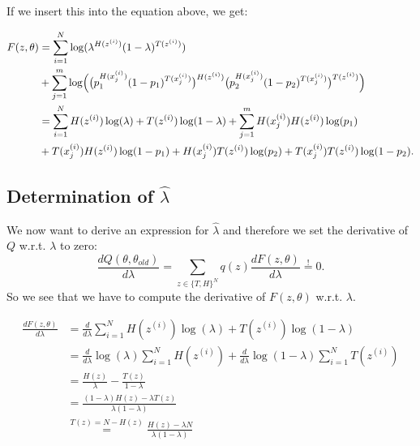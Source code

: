 \documentclass[paper=a4,fontsize=10pt,DIV11,BCOR10mm]{scrartcl}
\begin{document}
If we insert this into the equation above, we get:

\begin{align*}
F(z,\theta)&=\sum_{i=1}^N \log (\lambda^{H(z^{(i)})}(1-\lambda)^{T(z^{(i)})})\\
& + \sum_{j=1}^m \log \Bigl(\bigl( p_1^{H(x_j^{(i)})} (1-p_1)^{T(x_j^{(i)})}\bigr)^{H(z^{(i)})} \bigl(  p_2^{H(x_j^{(i)})} (1-p_2)^{T(x_j^{(i)})} \bigr)^{T(z^{(i)})} \Bigr)\\
&=\sum_{i=1}^N H(z^{(i)})\log (\lambda)+ T(z^{(i)}) \log (1-\lambda) +\sum_{j=1}^m  H(x_j^{(i)}) H(z^{(i)}) \log(p_1)\\
& + T(x_j^{(i)}) H(z^{(i)})\log(1-p_1) + H(x_j^{(i)})T(z^{(i)}) \log(p_2)+ T(x_j^{(i)})T(z^{(i)}) \log (1-p_2).
\end{align*}

\subsection*{Determination of $\hat \lambda$}
We now want to derive an expression for $\hat \lambda$ and therefore we set the derivative of $Q$ w.r.t. $\lambda$ to zero:
\begin{equation}\label{derQlambda}
\frac{dQ(\theta,\theta_{old})}{d\lambda}=\sum_{z\in \{T,H\}^N} q(z) \frac{dF(z,\theta)}{d\lambda} \stackrel{!}{=}0.
\end{equation}
So we see that we have to compute the derivative of $F(z,\theta)$ w.r.t. $\lambda$.

\begin{align*}
\frac{dF(z,\theta)}{d\lambda} &=\frac{d}{d\lambda}\sum_{i=1}^N H(z^{(i)})\log (\lambda)+ T(z^{(i)}) \log (1-\lambda)\\
&=\frac{d}{d\lambda}\log (\lambda)\sum_{i=1}^N H(z^{(i)})+  \frac{d}{d\lambda}\log (1-\lambda)\sum_{i=1}^N T(z^{(i)})\\
&= \frac{H(z)}{\lambda} - \frac{T(z)}{1-\lambda}\\
&=\frac{(1-\lambda)H(z)-\lambda T(z)}{\lambda(1-\lambda)}\\
& \stackrel{T(z)=N-H(z)}{=}\frac{H(z)-\lambda N}{\lambda(1-\lambda)}
\end{align*}
\end{document}
